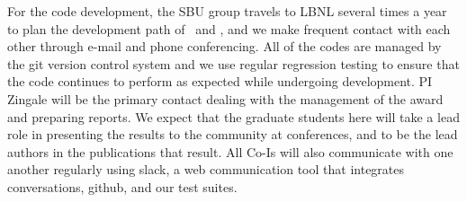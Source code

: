 \documentclass[11pt,letterpaper,english]{article}
\begin{document}
For the code development, the SBU group travels to LBNL several times
a year to plan the development path of \maestro\ and \castro, and we
make frequent contact with each other through e-mail and phone
conferencing.  All of the codes are managed by the git version control
system and we use regular regression testing to ensure that the code
continues to perform as expected while undergoing development.  PI
Zingale will be the primary contact dealing with the management of the
award and preparing reports.  We expect that the graduate students
here will take a lead role in presenting the results to the community
at conferences, and to be the lead authors in the publications that
result.  All Co-Is will also communicate with one another regularly
using {\sf slack}, a web communication tool that integrates
conversations, github, and our test suites.

\end{document}
